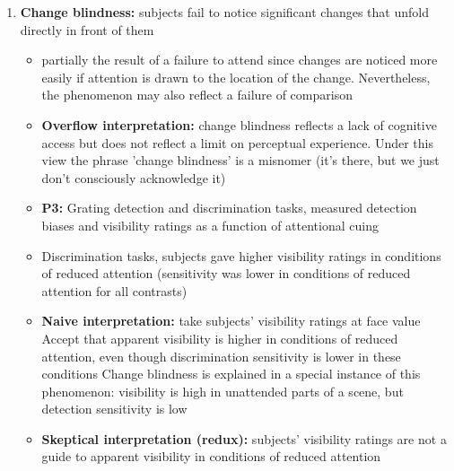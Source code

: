 \documentclass{article}
\begin{document}
\begin{enumerate}
    \item \textbf{Change blindness:} subjects fail to notice significant changes that unfold directly in front of them
        \begin{itemize}
            \item partially the result of a failure to attend since changes are noticed more easily if attention is drawn to the location of the change. Nevertheless, the phenomenon may also reflect a failure of comparison
            \item \textbf{Overflow interpretation:} change blindness reflects a lack of cognitive access but does not reflect a limit on perceptual experience. Under this view the phrase 'change blindness' is a misnomer (it's there, but we just don't consciously acknowledge it) 
            \item \textbf{P3:} Grating detection and discrimination tasks, measured detection biases and visibility ratings as a function of attentional cuing
            \item Discrimination tasks, subjects gave higher visibility ratings in conditions of reduced attention (sensitivity was lower in conditions of reduced attention for all contrasts) 
            \item \textbf{Naive interpretation:} take subjects' visibility ratings at face value
                \subitem Accept that apparent visibility is higher in conditions of reduced attention, even though discrimination sensitivity is lower in these conditions \subitem Change blindness is explained in a special instance of this phenomenon: visibility is high in unattended parts of a scene, but detection sensitivity is low
            \item \textbf{Skeptical interpretation (redux):} subjects' visibility ratings are not a guide to apparent visibility in conditions of reduced attention
        \end{itemize}
\end{enumerate}
\end{document}

